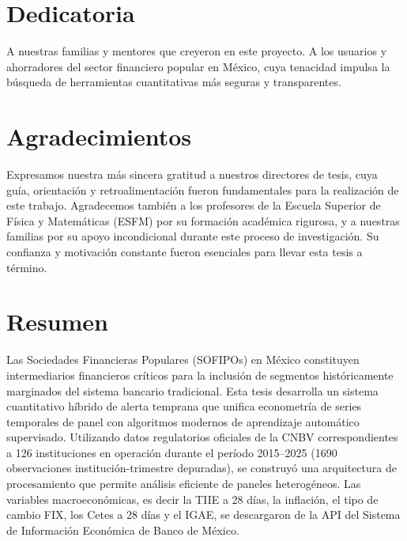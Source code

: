

\chapter*{Dedicatoria}
A nuestras familias y mentores que creyeron en este proyecto. A los usuarios y ahorradores del sector financiero popular en México, cuya tenacidad impulsa la búsqueda de herramientas cuantitativas más seguras y transparentes.

\chapter*{Agradecimientos}
Expresamos nuestra más sincera gratitud a nuestros directores de tesis, cuya guía, orientación y retroalimentación fueron fundamentales para la realización de este trabajo. Agradecemos también a los profesores de la Escuela Superior de Física y Matemáticas (ESFM) por su formación académica rigurosa, y a nuestras familias por su apoyo incondicional durante este proceso de investigación. Su confianza y motivación constante fueron esenciales para llevar esta tesis a término.

\chapter*{Resumen}
Las Sociedades Financieras Populares (SOFIPOs) en México constituyen intermediarios financieros críticos para la inclusión de segmentos históricamente marginados del sistema bancario tradicional. Esta tesis desarrolla un sistema cuantitativo híbrido de alerta temprana que unifica econometría de series temporales de panel con algoritmos modernos de aprendizaje automático supervisado. Utilizando datos regulatorios oficiales de la CNBV correspondientes a 126 instituciones en operación durante el período 2015--2025 (1690 observaciones institución-trimestre depuradas), se construyó una arquitectura de procesamiento que permite análisis eficiente de paneles heterogéneos. Las variables macroeconómicas, es decir la TIIE a 28 días, la inflación, el tipo de cambio FIX, los Cetes a 28 días y el IGAE, se descargaron de la API del Sistema de Información Económica de Banco de México.

